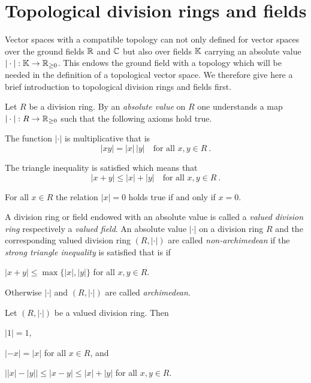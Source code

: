 \section{Topological division rings and fields}
\label{sec:topological-division-rings-fields}

\para Vector spaces with a compatible topology can not only defined for vector spaces over the ground fields 
$\mathbb{R}$ and $\mathbb{C}$ but also over fields $\mathbb{K}$ carrying an absolute value
$|\cdot | : \mathbb{K} \to \mathbb{R}_{\geq 0}$. This endows the ground field with a topology which will be needed in the
definition of a topological vector space. We therefore give here a brief introduction to topological division
rings and fields first.

\begin{definition}
  Let $R$ be a division ring. By an \emph{absolute value} on $R$ one understands a map $ |\cdot | : R \to \mathbb{R}_{\geq 0}$
  such that the following axioms hold true.
  \begin{axiomlist}[VDR]
  \item 
  \label{axiom:field-absolute-value-multiplicativity}
     The function $| \cdot |$ is multiplicative that is 
     \[ |xy| = |x|  \, | y| \quad \text{for all } x,y \in R \ . \]
  \item 
  \label{axiom:field-absolute-value-subadditivity} 
    The triangle inequality is satisfied which means that 
    \[ |x + y| \leq  |x| +  | y| \quad  \text{for all } x,y \in R \ . \]
  \item
  \label{axiom:field-absolute-value-nondegeneracy} 
  For all $x \in R$ the relation $|x|=0$ holds true if and only if $x=0$. 
  \end{axiomlist}
  A division ring or field endowed with an absolute value is called a \emph{valued division ring} 
  respectively a \emph{valued field}. 
  An absolute value $|\cdot|$ on a division ring $R$ and the corresponding valued
  division ring $(R,|\cdot|)$ are called \emph{non-archimedean} if 
  the \emph{strong triangle inequality} is satisfied that is if
  \begin{axiomlist}[VDR]
  \setcounter{enumi}{3}
  \item\label{axiom:field-absolute-value-non-archimedean} 
    $ |x + y| \leq  \max \{ |x| , | y| \} $ for all $x,y \in R$.
  \end{axiomlist}
  Otherwise $|\cdot|$ and $(R,|\cdot|)$ are called \emph{archimedean}.
\end{definition}


\begin{lemma}
  Let $(R,|\cdot|)$ be a valued division ring. Then
  \begin{romanlist}
  \item\label{ite:absolute-value-one}
     $|1|=1$,
   \item\label{ite:absolute-value-negative}
     $|-x| =|x|$ for all $x\in R$, and
  \item\label{ite:absolute-value-difference}
     $\big| |x| - |y| \big| \leq |x - y|   \leq  |x| + |y|$ for all $x,y\in R$.
  \end{romanlist}
\end{lemma}

